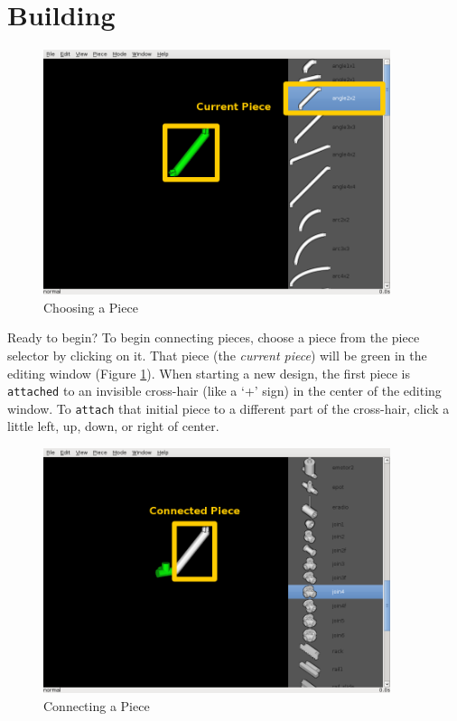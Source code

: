 \documentclass[12pt]{report}
\begin{document}
\section{Building}

\begin{figure}[h]
\begin{center}
\includegraphics[width=4.0in]{doc_images/manual_current_piece.png}
\caption{Choosing a Piece}
\label{CurrentPiece}
\end{center}
\end{figure}

Ready to begin?  To begin connecting pieces, choose a piece from the
piece selector by clicking on it.  That piece (the \emph{current
  piece}) will be green in the editing window (Figure
\ref{CurrentPiece}).  When starting a new design, the first piece is
    {\tt attached} to an invisible cross-hair (like a `+' sign) in the
    center of the editing window.  To {\tt attach} that initial piece
    to a different part of the cross-hair, click a little left, up,
    down, or right of center.

\begin{figure}[h]
\begin{center}
\includegraphics[width=4.0in]{doc_images/manual_connected_piece.png}
\caption{Connecting a Piece}
\label{ConnectedPiece}
\end{center}
\end{figure}
\end{document}
